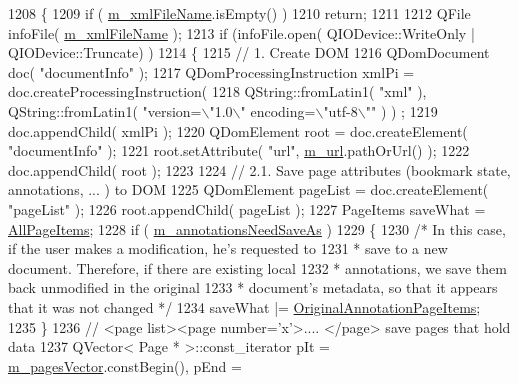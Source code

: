 \begin{DoxyCode}
1208 \{
1209     \textcolor{keywordflow}{if} ( \hyperlink{classOkular_1_1DocumentPrivate_aae08e3c4d234247bf3d52608649e7c64}{m\_xmlFileName}.isEmpty() )
1210         \textcolor{keywordflow}{return};
1211 
1212     QFile infoFile( \hyperlink{classOkular_1_1DocumentPrivate_aae08e3c4d234247bf3d52608649e7c64}{m\_xmlFileName} );
1213     \textcolor{keywordflow}{if} (infoFile.open( QIODevice::WriteOnly | QIODevice::Truncate) )
1214     \{
1215         \textcolor{comment}{// 1. Create DOM}
1216         QDomDocument doc( \textcolor{stringliteral}{"documentInfo"} );
1217         QDomProcessingInstruction xmlPi = doc.createProcessingInstruction(
1218                 QString::fromLatin1( \textcolor{stringliteral}{"xml"} ), QString::fromLatin1( \textcolor{stringliteral}{"version=\(\backslash\)"1.0\(\backslash\)" encoding=\(\backslash\)"utf-8\(\backslash\)""} ) )
      ;
1219         doc.appendChild( xmlPi );
1220         QDomElement root = doc.createElement( \textcolor{stringliteral}{"documentInfo"} );
1221         root.setAttribute( \textcolor{stringliteral}{"url"}, \hyperlink{classOkular_1_1DocumentPrivate_a1a0145bbb16d15c016000a83d0d2ab2b}{m\_url}.pathOrUrl() );
1222         doc.appendChild( root );
1223 
1224         \textcolor{comment}{// 2.1. Save page attributes (bookmark state, annotations, ... ) to DOM}
1225         QDomElement pageList = doc.createElement( \textcolor{stringliteral}{"pageList"} );
1226         root.appendChild( pageList );
1227         PageItems saveWhat = \hyperlink{namespaceOkular_ad8955fd515cc3f63a14cdff6723e6c1bad157628664d884c59d2cc11bcdddb76a}{AllPageItems};
1228         \textcolor{keywordflow}{if} ( \hyperlink{classOkular_1_1DocumentPrivate_a44f722aa34fee888929abd92fe54ad82}{m\_annotationsNeedSaveAs} )
1229         \{
1230             \textcolor{comment}{/* In this case, if the user makes a modification, he's requested to}
1231 \textcolor{comment}{             * save to a new document. Therefore, if there are existing local}
1232 \textcolor{comment}{             * annotations, we save them back unmodified in the original}
1233 \textcolor{comment}{             * document's metadata, so that it appears that it was not changed */}
1234             saveWhat |= \hyperlink{namespaceOkular_ad8955fd515cc3f63a14cdff6723e6c1ba1feb4fde97e57698f97d64a2a3b824bb}{OriginalAnnotationPageItems};
1235         \}
1236         \textcolor{comment}{// <page list><page number='x'>.... </page> save pages that hold data}
1237         QVector< Page * >::const\_iterator pIt = \hyperlink{classOkular_1_1DocumentPrivate_a73b852d9a73ffe8061b66dbf9b290f17}{m\_pagesVector}.constBegin(), pEnd = 

\end{DoxyCode}
